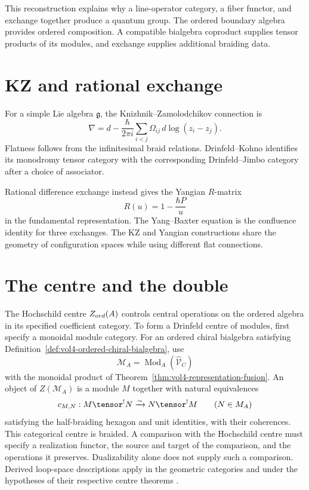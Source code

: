 This reconstruction explains why a line-operator category, a fiber functor, and exchange together produce a quantum group. The ordered boundary algebra provides ordered composition.  A compatible bialgebra coproduct supplies tensor products of its modules, and exchange supplies additional braiding data.

\chapter{KZ and rational exchange}
For a simple Lie algebra $\mathfrak g$, the Knizhnik--Zamolodchikov connection is
\[
 \nabla=d-\frac{\hbar}{2\pi i}
 \sum_{i<j}\Omega_{ij}\,d\log(z_i-z_j).
\]
Flatness follows from the infinitesimal braid relations. Drinfeld--Kohno identifies its monodromy tensor category with the corresponding Drinfeld--Jimbo category after a choice of associator.

Rational difference exchange instead gives the Yangian $R$-matrix
\[
 R(u)=1-\frac{\hbar P}{u}
\]
in the fundamental representation. The Yang--Baxter equation is the confluence identity for three exchanges. The KZ and Yangian constructions share the geometry of configuration spaces while using different flat connections.

\chapter{The centre and the double}
The Hochschild centre $Z_{ord}(A)$ controls central operations on the
ordered algebra in its specified coefficient category.
To form a Drinfeld centre of modules, first specify a monoidal module category.
For an ordered chiral bialgebra satisfying
Definition~\ref{def:vol4-ordered-chiral-bialgebra}, use
\[
 \mathcal M_A=\operatorname{Mod}_A(\widehat{\mathcal V}_C)
\]
with the monoidal product of Theorem~\ref{thm:vol4-representation-fusion}.
An object of $Z(\mathcal M_A)$ is a module $M$ together with natural equivalences
\[
 c_{M,N}:M\widehat{\tensor}^{!}N
 \xrightarrow{\sim}N\widehat{\tensor}^{!}M
 \qquad(N\in\mathcal M_A)
\]
satisfying the half-braiding hexagon and unit identities, with their coherences.
This categorical centre is braided.
A comparison with the Hochschild centre must specify a realization functor,
the source and target of the comparison, and the operations it preserves.
Dualizability alone does not supply such a comparison.
Derived loop-space descriptions apply in the geometric categories and
under the hypotheses of their respective centre theorems
\cite{BenZviFrancisNadler}.

